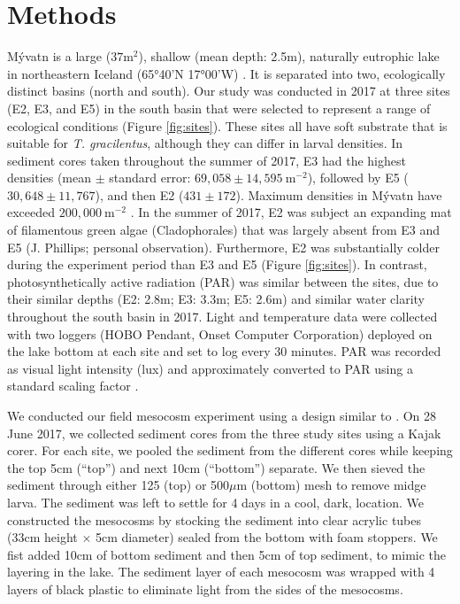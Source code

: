 

\section*{Methods}


M\'{y}vatn is a large ($37\text{m}^2$), shallow (mean depth: 2.5m), 
naturally eutrophic lake in northeastern Iceland (65°40’N 17°00’W) \citep{einarsson2004}.
It is separated into two, ecologically distinct basins (north and south).
Our study was conducted in 2017 at three sites (E2, E3, and E5) in the south basin 
that were selected to represent a range of ecological conditions (Figure \ref{fig:sites}).
These sites all have soft substrate that is suitable for \emph{T. gracilentus},
although they can differ in larval densities. 
In sediment cores taken throughout the summer of 2017, E3 had the highest densities 
(mean $\pm$ standard error: $69,058 \pm 14,595~\text{m}^{-2}$),
followed by E5 ($30,648 \pm 11,767$), and then E2 ($431 \pm 172$).
Maximum densities in M\'{y}vatn have exceeded $200,000~\text{m}^{-2}$ \citep{lindegaard1979}.
In the summer of 2017, 
E2 was subject an expanding mat of filamentous green algae (Cladophorales) 
that was largely absent from E3 and E5 (J. Phillips; personal observation).
Furthermore, E2 was substantially colder during the experiment period than 
E3 and E5 (Figure \ref{fig:sites}).
In contrast, photosynthetically active radiation (PAR) was similar between the sites,
due to their similar depths (E2: 2.8m; E3: 3.3m; E5: 2.6m)
and similar water clarity throughout the south basin in 2017.
Light and temperature data were collected with two loggers 
(HOBO Pendant, Onset Computer Corporation) deployed on the lake bottom at each site
and set to log every 30 minutes.
PAR was recorded as visual light intensity (lux)
and approximately converted to PAR using a standard scaling factor \citep{thimijan1983}.

We conducted our field mesocosm experiment using a design
similar to \citep{phillips2019}.
On 28 June 2017, we collected sediment cores from the three study sites using a Kajak corer. 
For each site, we pooled the sediment from the different cores while keeping the 
top 5cm (``top'') and next 10cm (``bottom'') separate.
We then sieved the sediment through either 125 (top) or 500$\mu \text{m}$ (bottom) mesh
to remove midge larva.
The sediment was left to settle for 4 days in a cool, dark, location.
We constructed the mesocosms by stocking the sediment into 
clear acrylic tubes (33cm height $\times$ 5cm diameter) 
sealed from the bottom with foam stoppers.
We fist added 10cm of bottom sediment and then 5cm of top sediment, 
to mimic the layering in the lake.
The sediment layer of each mesocosm was wrapped with 4 layers of black plastic
to eliminate light from the sides of the mesocosms.

